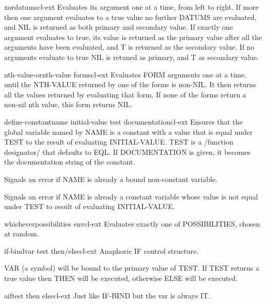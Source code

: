\begin{macro}{xor}{\rest datums}{cl-ext}{}
  Evaluates its argument one at a time, from left to right. If more then one
argument evaluates to a true value no further DATUMS are evaluated, and NIL is
returned as both primary and secondary value. If exactly one argument
evaluates to true, its value is returned as the primary value after all the
arguments have been evaluated, and T is returned as the secondary value. If no
arguments evaluate to true NIL is retuned as primary, and T as secondary
value.
\end{macro}

\begin{macro}{nth-value-or}{nth-value \body forms}{cl-ext}{}
  Evaluates FORM arguments one at a time, until the NTH-VALUE returned by one
of the forms is non-NIL. It then returns all the values returned by evaluating
that form. If none of the forms return a non-nil nth value, this form returns
NIL.
\end{macro}

\begin{macro}{define-constant}{name initial-value \key test documentation}{cl-ext}{}
  Ensures that the global variable named by NAME is a constant with a value
that is equal under TEST to the result of evaluating INITIAL-VALUE. TEST is a
/function designator/ that defaults to EQL. If DOCUMENTATION is given, it
becomes the documentation string of the constant.

Signals an error if NAME is already a bound non-constant variable.

Signals an error if NAME is already a constant variable whose value is not
equal under TEST to result of evaluating INITIAL-VALUE.
\end{macro}

\begin{macro}{whichever}{\rest possibilities \env env}{cl-ext}{}
  Evaluates exactly one of POSSIBILITIES, chosen at random.
\end{macro}

\begin{macro}{if-bind}{var test \body then/else}{cl-ext}{}
  Anaphoric IF control structure.

VAR (a symbol) will be bound to the primary value of TEST. If
TEST returns a true value then THEN will be executed, otherwise
ELSE will be executed.
\end{macro}

\begin{macro}{aif}{test then \op else}{cl-ext}{}
  Just like IF-BIND but the var is always IT.
\end{macro}

